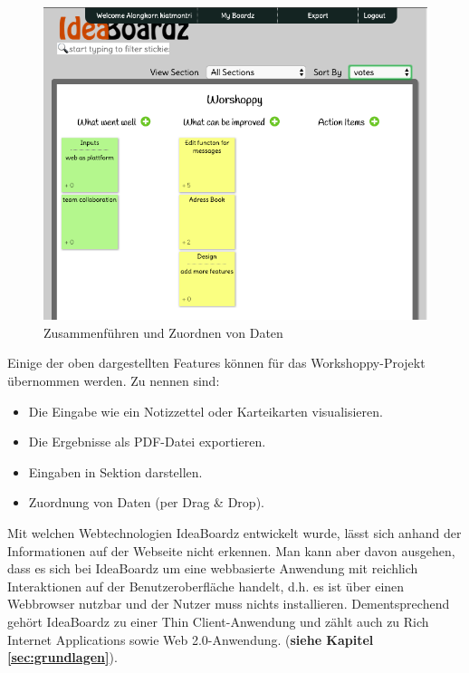 \begin{figure}[H]
  \begin{center}
    \includegraphics[scale=0.35]{img/ideaBoardz4}
	\caption{Zusammenführen und Zuordnen von Daten} 
	\label{fig:zusammenführen und zuordnen von daten}
  \end{center}   
\end{figure}

\newpage
Einige der oben dargestellten Features können für das Workshoppy-Projekt übernommen werden. Zu nennen sind:

\begin{itemize}
\item Die Eingabe wie ein Notizzettel oder Karteikarten visualisieren.
\item Die Ergebnisse als PDF-Datei exportieren.
\item Eingaben in Sektion darstellen.
\item Zuordnung von Daten (per Drag \& Drop).
\end{itemize}

Mit welchen Webtechnologien IdeaBoardz entwickelt wurde, lässt sich anhand der Informationen auf der Webseite nicht erkennen. Man kann aber davon ausgehen, dass es sich bei IdeaBoardz um eine webbasierte Anwendung mit reichlich Interaktionen auf der Benutzeroberfläche handelt, d.h. es ist über einen Webbrowser nutzbar und der Nutzer muss nichts installieren. Dementsprechend gehört IdeaBoardz zu einer Thin Client-Anwendung und zählt auch zu Rich Internet Applications sowie Web 2.0-Anwendung. (\textbf{siehe Kapitel \ref{sec:grundlagen}}).

